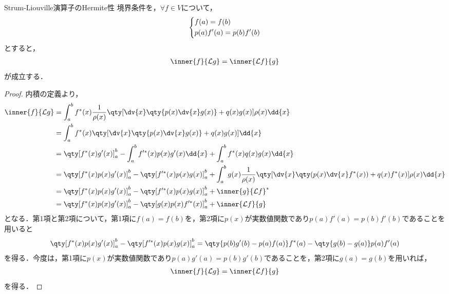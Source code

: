 \documentclass{report}
\begin{document}
      \begin{myprop}{Strum-Liouville演算子のHermite性}{}
        境界条件を，$\forall f \in V$について，
        \begin{align}
          \begin{dcases}
            f(a) = f(b) \\ 
            p(a)f'(a) = p(b)f'(b)
          \end{dcases}
        \end{align}
        とすると，
        \begin{align}
          \inner{f}{\mathcal{L}g} = \inner{\mathcal{L}f}{g}\label{hermite-def}
        \end{align}
        が成立する．
        \tcblower
        \begin{proof}
          内積の定義より，
          \begin{align}
            \inner{f}{\mathcal{L}g} &= \int_{a}^{b} f^*(x)\frac{1}{\rho(x)}\qty[\dv{x}\qty{p(x)\dv{x}g(x)} + q(x)g(x)]\rho(x)\dd{x} \\ 
            &= \int_{a}^{b} f^*(x)\qty[\dv{x}\qty{p(x)\dv{x}g(x)} + q(x)g(x)]\dd{x} \\ 
            &= \qty[f^*(x)g'(x)]_{a}^{b} - \int_{a}^{b}f'^*(x)p(x)g'(x)\dd{x} + \int_{a}^{b}f^*(x)q(x)g(x)\dd{x} \\ 
            &= \qty[f^*(x)p(x)g'(x)]_{a}^{b} - \qty[f'^*(x)p(x)g(x)]_{a}^{b} + \int_{a}^{b}g(x)\frac{1}{\rho(x)}\qty[\dv{x}\qty(p(x)\dv{x}f^*(x)) + q(x)f^*(x)]\rho(x)\dd{x} \\ 
            &= \qty[f^*(x)p(x)g'(x)]_{a}^{b} - \qty[f'^*(x)p(x)g(x)]_{a}^{b} + \inner{g}{\mathcal{L}f}^* \\ 
            &= \qty[f^*(x)p(x)g'(x)]_{a}^{b} - \qty[g(x)p(x)f'^*(x)]_{a}^{b} + \inner{\mathcal{L}f}{g} 
          \end{align}
          となる．第1項と第2項について，第1項に$f(a) = f(b)$を，第2項に$p(x)$が実数値関数であり$p(a)f'(a) = p(b)f'(b)$であることを用いると
          \begin{align}
            \qty[f^*(x)p(x)g'(x)]_{a}^{b} - \qty[f'^*(x)p(x)g(x)]_{a}^{b} = \qty{p(b)g'(b) - p(a)f(a)}f^*(a) - \qty{g(b) - g(a)}p(a)f'(a)
          \end{align}
          を得る．今度は，第1項に$p(x)$が実数値関数であり$p(a)g'(a) = p(b)g'(b)$であることを，第2項に$g(a) = g(b)$を用いれば，
          \begin{align}
            \inner{f}{\mathcal{L}g} = \inner{\mathcal{L}f}{g}
          \end{align}
          を得る．
        \end{proof}
      \end{myprop}
\end{document}
